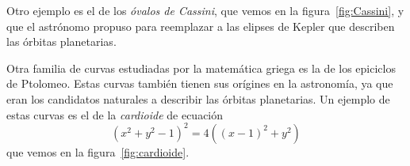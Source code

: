 Otro ejemplo es el de los \emph{óvalos de Cassini}, que vemos en la
figura~\ref{fig:Cassini}, y que el astrónomo propuso para reemplazar a las
elipses de Kepler que describen las órbitas planetarias. 

Otra familia de curvas estudiadas por la matemática griega es la de los
epiciclos de Ptolomeo. Estas curvas también tienen sus orígines en la
astronomía, ya que eran los candidatos naturales a describir las órbitas
planetarias. Un ejemplo de estas curvas es el de la \emph{cardioide} de ecuación
\[
	(x^2+y^2-1)^2=4( (x-1)^2+y^2)
\]
que vemos en la figura~\ref{fig:cardioide}.
